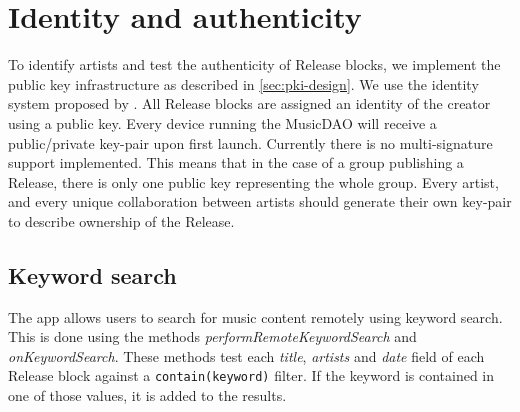 \section{Identity and authenticity}
To identify artists and test the authenticity of Release blocks, we implement the public key infrastructure as described in \ref{sec:pki-design}. We use the identity system proposed by \cite{mattskala2020}. All Release blocks are assigned an identity of the creator using a public key. Every device running the MusicDAO will receive a public/private key-pair upon first launch. Currently there is no multi-signature support implemented. This means that in the case of a group publishing a Release, there is only one public key representing the whole group. Every artist, and every unique collaboration between artists should generate their own key-pair to describe ownership of the Release.


\subsection{Keyword search}
\label{sec:searching-musiccommunity-impl}
The app allows users to search for music content remotely using keyword search. This is done using the methods \textit{performRemoteKeywordSearch} and \textit{onKeywordSearch}. These methods test each \textit{title}, \textit{artists} and \textit{date} field of each Release block against a \verb|contain(keyword)| filter. If the keyword is contained in one of those values, it is added to the results.

